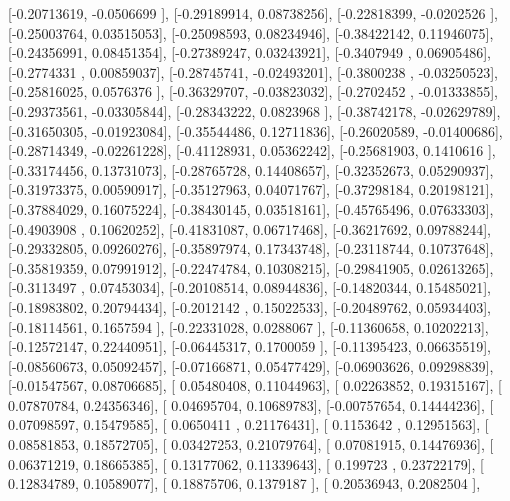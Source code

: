 \documentclass{article}
\begin{document}
       [-0.20713619, -0.0506699 ],
       [-0.29189914,  0.08738256],
       [-0.22818399, -0.0202526 ],
       [-0.25003764,  0.03515053],
       [-0.25098593,  0.08234946],
       [-0.38422142,  0.11946075],
       [-0.24356991,  0.08451354],
       [-0.27389247,  0.03243921],
       [-0.3407949 ,  0.06905486],
       [-0.2774331 ,  0.00859037],
       [-0.28745741, -0.02493201],
       [-0.3800238 , -0.03250523],
       [-0.25816025,  0.0576376 ],
       [-0.36329707, -0.03823032],
       [-0.2702452 , -0.01333855],
       [-0.29373561, -0.03305844],
       [-0.28343222,  0.0823968 ],
       [-0.38742178, -0.02629789],
       [-0.31650305, -0.01923084],
       [-0.35544486,  0.12711836],
       [-0.26020589, -0.01400686],
       [-0.28714349, -0.02261228],
       [-0.41128931,  0.05362242],
       [-0.25681903,  0.1410616 ],
       [-0.33174456,  0.13731073],
       [-0.28765728,  0.14408657],
       [-0.32352673,  0.05290937],
       [-0.31973375,  0.00590917],
       [-0.35127963,  0.04071767],
       [-0.37298184,  0.20198121],
       [-0.37884029,  0.16075224],
       [-0.38430145,  0.03518161],
       [-0.45765496,  0.07633303],
       [-0.4903908 ,  0.10620252],
       [-0.41831087,  0.06717468],
       [-0.36217692,  0.09788244],
       [-0.29332805,  0.09260276],
       [-0.35897974,  0.17343748],
       [-0.23118744,  0.10737648],
       [-0.35819359,  0.07991912],
       [-0.22474784,  0.10308215],
       [-0.29841905,  0.02613265],
       [-0.3113497 ,  0.07453034],
       [-0.20108514,  0.08944836],
       [-0.14820344,  0.15485021],
       [-0.18983802,  0.20794434],
       [-0.2012142 ,  0.15022533],
       [-0.20489762,  0.05934403],
       [-0.18114561,  0.1657594 ],
       [-0.22331028,  0.0288067 ],
       [-0.11360658,  0.10202213],
       [-0.12572147,  0.22440951],
       [-0.06445317,  0.1700059 ],
       [-0.11395423,  0.06635519],
       [-0.08560673,  0.05092457],
       [-0.07166871,  0.05477429],
       [-0.06903626,  0.09298839],
       [-0.01547567,  0.08706685],
       [ 0.05480408,  0.11044963],
       [ 0.02263852,  0.19315167],
       [ 0.07870784,  0.24356346],
       [ 0.04695704,  0.10689783],
       [-0.00757654,  0.14444236],
       [ 0.07098597,  0.15479585],
       [ 0.0650411 ,  0.21176431],
       [ 0.1153642 ,  0.12951563],
       [ 0.08581853,  0.18572705],
       [ 0.03427253,  0.21079764],
       [ 0.07081915,  0.14476936],
       [ 0.06371219,  0.18665385],
       [ 0.13177062,  0.11339643],
       [ 0.199723  ,  0.23722179],
       [ 0.12834789,  0.10589077],
       [ 0.18875706,  0.1379187 ],
       [ 0.20536943,  0.2082504 ],
\end{document}
